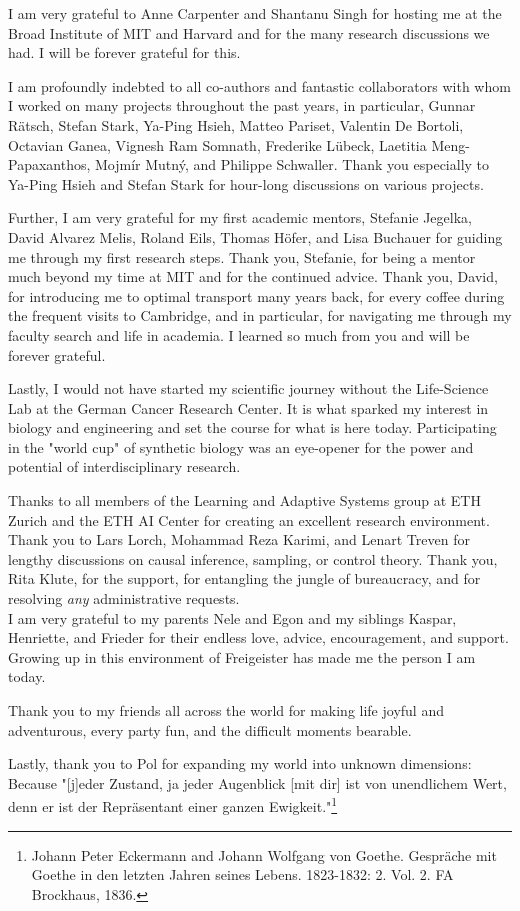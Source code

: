 I am very grateful to Anne Carpenter and Shantanu Singh for hosting me at the Broad Institute of MIT and Harvard and for the many research discussions we had. I will be forever grateful for this.

I am profoundly indebted to all co-authors and fantastic collaborators with whom I worked on many projects throughout the past years, in particular, Gunnar R\"atsch, Stefan Stark, Ya-Ping Hsieh,  Matteo Pariset, Valentin De Bortoli, Octavian Ganea, Vignesh Ram Somnath, Frederike L{\"u}beck, Laetitia Meng-Papaxanthos, Mojm{\'i}r Mutn{\'y}, and Philippe Schwaller. Thank you especially to Ya-Ping Hsieh and Stefan Stark for hour-long discussions on various projects. 

Further, I am very grateful for my first academic mentors, Stefanie Jegelka, David Alvarez Melis, Roland Eils, Thomas H\"ofer, and Lisa Buchauer for guiding me through my first research steps.
Thank you, Stefanie, for being a mentor much beyond my time at MIT and for the continued advice. 
Thank you, David, for introducing me to optimal transport many years back, for every coffee during the frequent visits to Cambridge, and in particular, for navigating me through my faculty search and life in academia. I learned so much from you and will be forever grateful.

Lastly, I would not have started my scientific journey without the Life-Science Lab at the German Cancer Research Center. It is what sparked my interest in biology and engineering and set the course for what is here today.
Participating in the "world cup" of synthetic biology was an eye-opener for the power and potential of interdisciplinary research.

 Thanks to all members of the Learning and Adaptive Systems group at ETH Zurich and the ETH AI Center for creating an excellent research environment. Thank you to Lars Lorch, Mohammad Reza Karimi, and Lenart Treven for lengthy discussions on causal inference, sampling, or control theory. 
Thank you, Rita Klute, for the support, for entangling the jungle of bureaucracy, and for resolving \emph{any} administrative requests. \\

I am very grateful to my parents Nele and Egon and my siblings Kaspar, Henriette, and Frieder for their endless love, advice, encouragement, and support.
Growing up in this environment of Freigeister has made me the person I am today.

Thank you to my friends all across the world for making life joyful and adventurous, every party fun, and the difficult moments bearable.

Lastly, thank you to Pol for expanding my world into unknown dimensions: Because "[j]eder Zustand, ja jeder Augenblick [mit dir] ist von unendlichem Wert, denn er ist der Repr{\"a}sentant einer ganzen Ewigkeit."\footnote{Johann Peter Eckermann and Johann Wolfgang von Goethe. Gespr{\"a}che mit Goethe in den letzten Jahren seines Lebens. 1823-1832: 2. Vol. 2. FA Brockhaus, 1836.}


\endgroup

